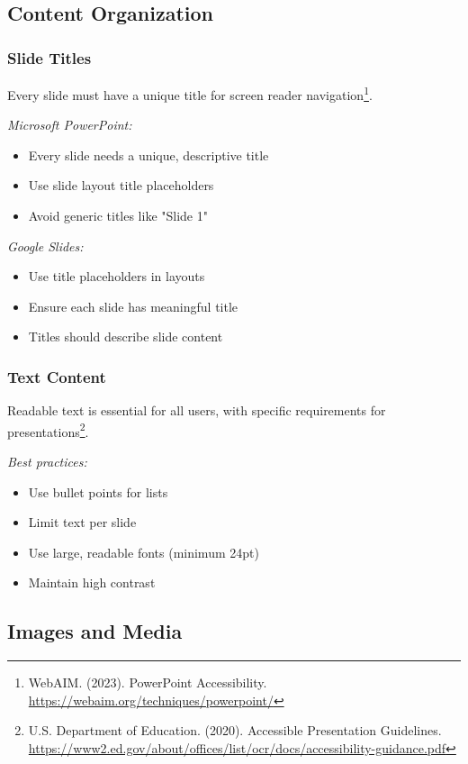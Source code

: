 \subsection{Content Organization}

\subsubsection{Slide Titles}
Every slide must have a unique title for screen reader navigation\footnote{WebAIM. (2023). PowerPoint Accessibility. \url{https://webaim.org/techniques/powerpoint/}}.

\emph{Microsoft PowerPoint:}
\begin{itemize}
\item Every slide needs a unique, descriptive title
\item Use slide layout title placeholders
\item Avoid generic titles like "Slide 1"
\end{itemize}

\emph{Google Slides:}
\begin{itemize}
\item Use title placeholders in layouts
\item Ensure each slide has meaningful title
\item Titles should describe slide content
\end{itemize}

\subsubsection{Text Content}
Readable text is essential for all users, with specific requirements for presentations\footnote{U.S. Department of Education. (2020). Accessible Presentation Guidelines. \url{https://www2.ed.gov/about/offices/list/ocr/docs/accessibility-guidance.pdf}}.

\emph{Best practices:}
\begin{itemize}
\item Use bullet points for lists
\item Limit text per slide
\item Use large, readable fonts (minimum 24pt)
\item Maintain high contrast
\end{itemize}

\subsection{Images and Media}

